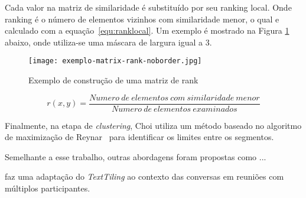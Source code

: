 Cada valor na matriz de similaridade é substituído por seu ranking local. Onde ranking é o número de elementos vizinhos com similaridade menor, o qual e calculado com a equação~\ref{equ:ranklocal}. Um exemplo é mostrado na Figura \ref{fig:exemplomatrixrank} abaixo, onde utiliza-se uma máscara de largura igual a 3.



  \begin{figure}[!h]

	\centering
	\texttt{[image: exemplo-matrix-rank-noborder.jpg]}
	\caption{Exemplo de construção de uma matriz de rank}
	\label{fig:exemplomatrixrank}

  \end{figure}




\begin{equation}
r(x,y) = \frac
{Numero\ de\ elementos\ com\ similaridade\ menor}
{Numero\ de\ elementos\ examinados}
\label{equ:ranklocal}
\end{equation}


	
	Finalmente, na etapa de \textit{clustering}, Choi utiliza um método baseado no algoritmo de maximização de Reynar~\cite{reynar} para identificar os limites entre os segmentos.




Semelhante a esse trabalho, outras abordagens foram propostas como ...

\cite{Banerjee2006} faz uma adaptação do \textit{TextTiling} ao contexto das conversas em reuniões com múltiplos participantes.  


